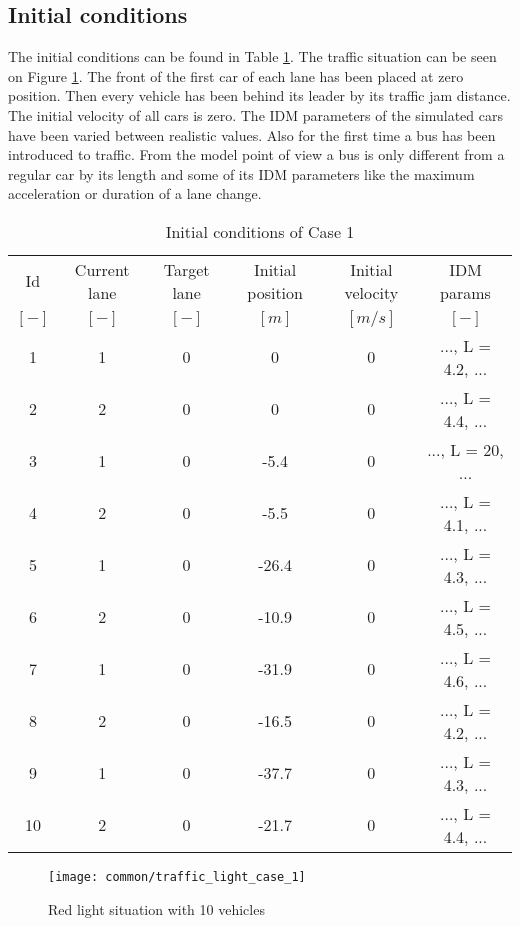 		\subsection*{Initial conditions}
		The initial conditions can be found in Table \ref{tab:case_1_definition_array}. The traffic situation can be seen on Figure \ref{fig:red_light_situation}. The front of the first car of each lane has been placed at zero position. Then every vehicle has been behind its leader by its traffic jam distance. The initial velocity of all cars is zero.  The IDM parameters of the simulated cars have been varied between realistic values. Also for the first time a bus has been introduced to traffic. From the model point of view a bus is only different from a regular car by its length and some of its IDM parameters like the maximum acceleration or duration of a lane change.
		\begin{table}
			\begin{center}
				\begin{tabular}{ |c|c|c|c|c|c| }
					\hline
					Id & Current lane & Target lane & Initial position & Initial velocity& IDM params\\
					$[-]$ & $[-]$ & $[-]$ & $[m]$ & $[m/s]$ & $[-]$\\
					\hline
					1 & 1 & 0 & 0 & 0 & ..., L = 4.2, ... \\
					2 & 2 & 0 & 0 & 0 & ..., L = 4.4, ... \\
					3 & 1 & 0 & -5.4 & 0 & ..., L = 20, ... \\
					4 & 2 & 0 & -5.5 & 0 & ..., L = 4.1, ... \\
					5 & 1 & 0 & -26.4 & 0 & ..., L = 4.3, ... \\
					6 & 2 & 0 & -10.9 & 0 & ..., L = 4.5, ... \\
					7 & 1 & 0 & -31.9 & 0 & ..., L = 4.6, ... \\
					8 & 2 & 0 & -16.5 & 0 & ..., L = 4.2, ... \\
					9 & 1 & 0 & -37.7 & 0 & ..., L = 4.3, ... \\
					10 & 2 & 0 & -21.7 & 0 & ..., L = 4.4, ... \\
					\hline
				\end{tabular}
			\end{center}
			\caption{Initial conditions of Case 1}
			\label{tab:case_1_definition_array}
		\end{table}
		\begin{figure}
			\centering
			\texttt{[image: common/traffic\_light\_case\_1]}
			\caption{Red light situation with 10 vehicles}
			\label{fig:red_light_situation}
		\end{figure}
